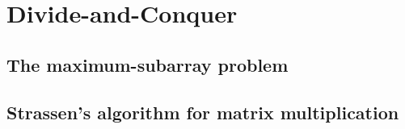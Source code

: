 \chapter{Divide-and-Conquer}
\section{The maximum-subarray problem}
\renewcommand{\thesubsection}{Exercise \thesection-\arabic{subsection}}
\subsection{}

\subsection{}

\subsection{}

\subsection{}

\subsection{}

\section{Strassen's algorithm for matrix multiplication}
\subsection{}

\subsection{}

\subsection{}

\subsection{}

\subsection{}

\subsection{}

